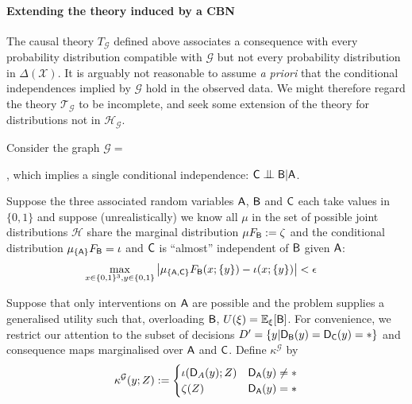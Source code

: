 \paragraph*{Extending the theory induced by a CBN} The causal theory $T_{\mathcal{G}}$ defined above associates a consequence with every probability distribution compatible with $\mathcal{G}$ but not every probability distribution in $\Delta(\mathcal{X})$. It is arguably not reasonable to assume \emph{a priori} that the conditional independences implied by $\mathcal{G}$ hold in the observed data. We might therefore regard the theory $\mathscr{T}_{\mathcal{G}}$ to be incomplete, and seek some extension of the theory for distributions not in $\mathcal{H}_{\mathcal{G}}$.

\begin{example}\label{ex:extn_cbn}

Consider the graph $\mathcal{G}=$, which implies a single conditional independence: $\RV{C}\CI \RV{B}|\RV{A}$.

Suppose the three associated random variables $\mathsf{A}$, $\mathsf{B}$ and $\mathsf{C}$ each take values in $\{0,1\}$ and suppose (unrealistically) we know all $\mu$ in the set of possible joint distributions $\mathscr{H}$ share the marginal distribution $\mu F_{\mathsf{B}} := \zeta$ and the conditional distribution $\mu_{\{\mathsf{A}\}} F_{\mathsf{B}} = \iota$ and $\mathsf{C}$ is ``almost'' independent of $\mathsf{B}$ given $\mathsf{A}$:
\begin{align}
    \max_{x\in\{0,1\}^3,y\in\{0,1\}}\left|\mu_{\{\mathsf{A},\mathsf{C}\}} F_{\mathsf{B}}(x;\{y\}) - \iota(x;\{y\}) \right| &< \epsilon \label{eq:app_ci}
\end{align}

Suppose that only interventions on $\mathsf{A}$ are possible and the problem supplies a generalised utility such that, overloading $\mathsf{B}$, $U(\xi)=\mathbb{E}_{\xi}[\mathsf{B}]$. For convenience, we restrict our attention to the subset of decisions $D'=\{y|\mathsf{D}_{\mathsf{B}}(y)=\mathsf{D}_{\mathsf{C}}(y)=*\}$ and consequence maps marginalised over $\mathsf{A}$ and $\mathsf{C}$. Define $\kappa^{\mathcal{G}}$ by
\begin{align}
    \kappa^{\mathcal{G}}(y;Z) := \begin{cases} \iota(\mathsf{D}_A(y);Z) & \mathsf{D}_{\mathsf{A}}(y) \neq *\\
                                              \zeta(Z) & \mathsf{D}_{\mathsf{A}}(y) = *\end{cases}
\end{align}


\end{example}
